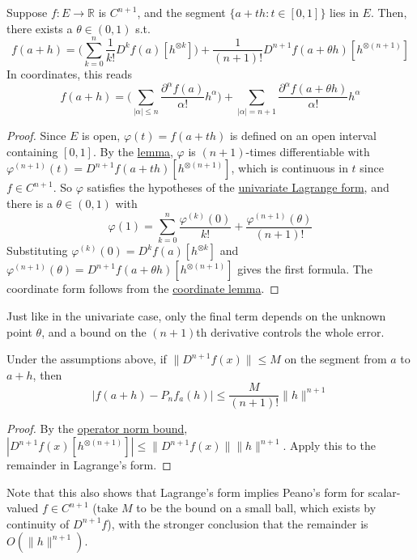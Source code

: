   \begin{theorem}
    \label{thm:multivariate-taylor-lagrange}
    Suppose $f: E \to \mathbb{R}$ is $C^{n+1}$, and the segment $\{a + th : t \in [0, 1]\}$ lies in $E$. Then, there exists a $\theta \in (0, 1)$ s.t. 
    \begin{equation}
      f(a + h) = \bigg( \sum_{k=0}^n \frac{1}{k!} D^k f(a) [h^{\otimes k}] \bigg) + \frac{1}{(n+1)!} D^{n+1} f(a + \theta h) [h^{\otimes (n+1)}]
    \end{equation}
    In coordinates, this reads 
    \begin{equation}
      f(a + h) = \bigg( \sum_{|\alpha| \leq n} \frac{\partial^\alpha f(a)}{\alpha!} h^\alpha \bigg) + \sum_{|\alpha| = n+1} \frac{\partial^\alpha f(a + \theta h)}{\alpha!} h^\alpha
    \end{equation}
  \end{theorem}
  \begin{proof}
    Since $E$ is open, $\varphi(t) = f(a + th)$ is defined on an open interval containing $[0, 1]$. By the \hyperref[thm:derivatives-along-a-line]{lemma}, $\varphi$ is $(n+1)$-times differentiable with $\varphi^{(n+1)}(t) = D^{n+1} f(a + th)[h^{\otimes (n+1)}]$, which is continuous in $t$ since $f \in C^{n+1}$. So $\varphi$ satisfies the hypotheses of the \hyperref[real-thm:taylor-lagrange]{univariate Lagrange form}, and there is a $\theta \in (0, 1)$ with 
    \begin{equation}
      \varphi(1) = \sum_{k=0}^n \frac{\varphi^{(k)}(0)}{k!} + \frac{\varphi^{(n+1)}(\theta)}{(n+1)!}
    \end{equation}
    Substituting $\varphi^{(k)}(0) = D^k f(a) [h^{\otimes k}]$ and $\varphi^{(n+1)}(\theta) = D^{n+1} f(a + \theta h)[h^{\otimes (n+1)}]$ gives the first formula. The coordinate form follows from the \hyperref[thm:coordinate-form-of-kth-term]{coordinate lemma}. 
  \end{proof}

  Just like in the univariate case, only the final term depends on the unknown point $\theta$, and a bound on the $(n+1)$th derivative controls the whole error. 

  \begin{corollary}
    Under the assumptions above, if $\|D^{n+1} f(x)\| \leq M$ on the segment from $a$ to $a + h$, then 
    \begin{equation}
      \big| f(a + h) - P_n f_a (h) \big| \leq \frac{M}{(n+1)!} \|h\|^{n+1}
    \end{equation}
  \end{corollary}
  \begin{proof}
    By the \hyperref[lin-thm:operator_norm_bound]{operator norm bound}, $|D^{n+1} f(x) [h^{\otimes (n+1)}]| \leq \|D^{n+1} f(x)\| \|h\|^{n+1}$. Apply this to the remainder in Lagrange's form. 
  \end{proof}

  Note that this also shows that Lagrange's form implies Peano's form for scalar-valued $f \in C^{n+1}$ (take $M$ to be the bound on a small ball, which exists by continuity of $D^{n+1}f$), with the stronger conclusion that the remainder is $O(\|h\|^{n+1})$. 
